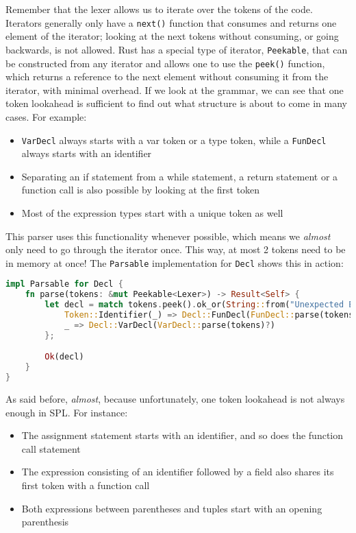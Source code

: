 Remember that the lexer allows us to iterate over the tokens of the code. Iterators generally only have a \lstinline[language=rust]|next()| function that consumes and returns one element of the iterator; looking at the next tokens without consuming, or going backwards, is not allowed. Rust has a special type of iterator, \lstinline[language=rust]|Peekable|, that can be constructed from any iterator and allows one to use the \lstinline[language=rust]|peek()| function, which returns a reference to the next element without consuming it from the iterator, with minimal overhead. If we look at the grammar, we can see that one token lookahead is sufficient to find out what structure is about to come in many cases. For example:

\begin{itemize}
    \item \lstinline[language=rust]|VarDecl| always starts with a var token or a type token, while a \lstinline[language=rust]|FunDecl| always starts with an identifier
    \item Separating an if statement from a while statement, a return statement or a function call is also possible by looking at the first token
    \item Most of the expression types start with a unique token as well
\end{itemize}

This parser uses this functionality whenever possible, which means we \textit{almost} only need to go through the iterator once. This way, at most 2 tokens need to be in memory at once! The \lstinline[language=rust]|Parsable| implementation for \lstinline[language=rust]|Decl| shows this in action:

\begin{lstlisting}[language=rust]
impl Parsable for Decl {
    fn parse(tokens: &mut Peekable<Lexer>) -> Result<Self> {
        let decl = match tokens.peek().ok_or(String::from("Unexpected EOF"))? {
            Token::Identifier(_) => Decl::FunDecl(FunDecl::parse(tokens)?),
            _ => Decl::VarDecl(VarDecl::parse(tokens)?)
        };

        Ok(decl)
    }
}
\end{lstlisting}

As said before, \textit{almost}, because unfortunately, one token lookahead is not always enough in SPL. For instance:

\begin{itemize}
    \item The assignment statement starts with an identifier, and so does the function call statement
    \item The expression consisting of an identifier followed by a field also shares its first token with a function call
    \item Both expressions between parentheses and tuples start with an opening parenthesis
\end{itemize}

